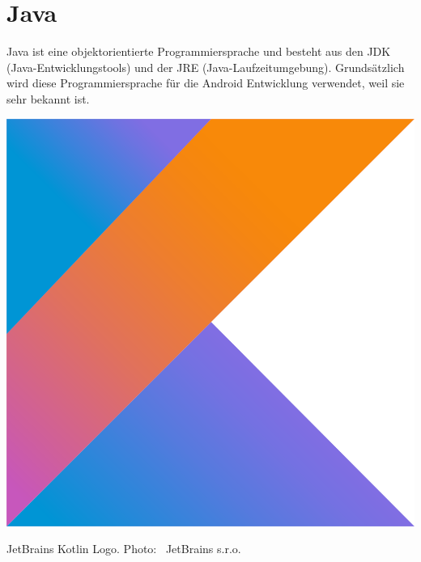 \documentclass{sigchi-ext}
\begin{document}
\section{Java}
Java ist eine objektorientierte Programmiersprache und besteht aus den JDK (Java-Entwicklungstools) und der JRE
 (Java-Laufzeitumgebung). Grundsätzlich wird diese Programmiersprache für die Android Entwicklung 
 verwendet, weil sie sehr bekannt ist.


\begin{marginfigure}[-16pc]
  \begin{minipage}{\marginparwidth}
    \centering
    \includegraphics[width=0.9\marginparwidth]{figures/kotlinlogo.png}
    \caption{JetBrains Kotlin Logo. Photo:
      \cczero~JetBrains s.r.o.}
  \end{minipage}
\end{marginfigure}
\end{document}
